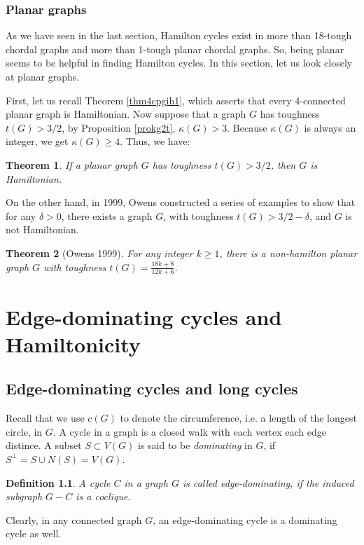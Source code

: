 \documentclass[12pt]{report}
\newtheorem{theorem}{Theorem}
\newtheorem{definition}{Definition}
\begin{document}
\subsection{Planar graphs}

As we have seen in the last section, Hamilton cycles exist in more than 18-tough chordal graphs and more than 1-tough planar chordal graphs. So, being planar seems to be helpful in finding Hamilton cycles. In this section, let us look closely at planar graphs.

First, let us recall Theorem \ref{thm4cpgih1}, which asserts that every 4-connected planar graph is Hamiltonian. Now suppose that a graph $G$ has toughness $t(G)>3/2$, by Proposition \ref{prokg2t}, $\kappa(G)>3$. Because $\kappa(G)$ is always an integer, we get $\kappa(G)\ge4$. Thus, we have:
\begin{theorem}
If a planar graph $G$ has toughness $t(G)>3/2$, then $G$ is Hamiltonian.
\end{theorem}

On the other hand, in 1999, Owens \cite{owens1999nonhamiltonian} constructed a series of examples to show that for any $\delta>0$, there exists a graph $G$, with toughness $t(G)>3/2-\delta$, and $G$ is not Hamiltonian.

\begin{theorem}[Owens 1999]\label{cethmow32tnh}
For any integer $k\ge1$, there is a non-hamilton planar graph $G$ with toughness $t(G)=\frac{18k+8}{12k+6}$.
\end{theorem}






\chapter{Edge-dominating cycles and Hamiltonicity}\label{ch3edcah}
\section{Edge-dominating cycles and long cycles}

Recall that we use $c(G)$ to denote the circumference, i.e. a length of the longest circle, in $G$. A cycle in a graph is a closed walk with each vertex each edge distince. A subset $S\subset V(G)$ is said to be {\em dominating} in $G$, if $S^{\perp}=S\cup N(S)=V(G)$.

\begin{definition}
A cycle $C$ in a graph $G$ is called edge-dominating, if the induced subgraph $G-C$ is a coclique.
\end{definition}
Clearly, in any connected graph $G$, an edge-dominating cycle is a dominating cycle as well.
\end{document}
